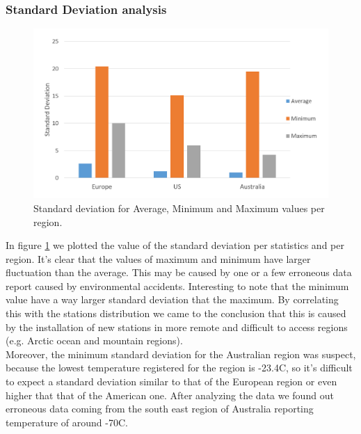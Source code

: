 \documentclass{vldb}
\begin{document}
\subsubsection{Standard Deviation analysis}
\begin{figure}[tbh]
\includegraphics[width=1\linewidth]{stdev}
\caption{Standard deviation for Average, Minimum and Maximum values per region.}
\label{fig:stdev}
\end{figure}
In figure \ref{fig:stdev} we plotted the value of the standard deviation per statistics and per region. It's clear that the values of maximum and minimum have larger fluctuation than the average. This may be caused by one or a few erroneous data report caused by environmental accidents. Interesting to note that the minimum value have a way larger standard deviation that the maximum. By correlating this with the stations distribution we came to the conclusion that this is caused by the installation of new stations in more remote and difficult to access regions (e.g. Arctic ocean and mountain regions). \\
Moreover, the minimum standard deviation for the Australian region was suspect, because the lowest temperature registered for the region is -23.4\degree C\cite{ausTemp}, so it's difficult to expect a standard deviation similar to that of the European region or even higher that that of the American one. After analyzing the data we found out erroneous data coming from the south east region of Australia reporting temperature of around -70\degree C.
\end{document}
